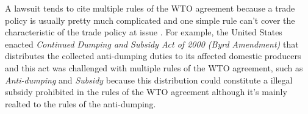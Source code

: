 A lawsuit tends to cite multiple rules of the WTO agreement because a trade policy is usually pretty much complicated 
and one simple rule can't cover the characteristic of the trade policy at issue \citep{palmeter2004dispute}.
For example, the United States enacted \textit{Continued Dumping and Subsidy Act of 2000 (Byrd Amendment)} that distributes 
the collected anti-dumping duties to its affected domestic producers and this act was challenged with multiple rules of the WTO agreement, 
such as \textit{Anti-dumping} and \textit{Subsidy} because 
this distribution could constitute a illegal subsidy prohibited 
in the rules of the WTO agreement although it's mainly realted to the rules of the anti-dumping. 

